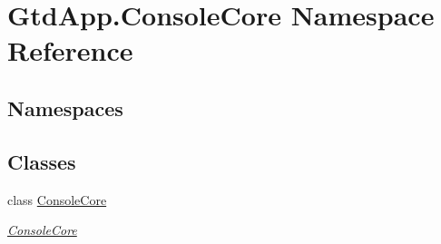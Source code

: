\hypertarget{namespace_gtd_app_1_1_console_core}{}\section{Gtd\+App.\+Console\+Core Namespace Reference}
\label{namespace_gtd_app_1_1_console_core}
\subsection*{Namespaces}
\begin{DoxyCompactItemize}
\end{DoxyCompactItemize}
\subsection*{Classes}
\begin{DoxyCompactItemize}
\item 
class \mbox{\hyperlink{class_gtd_app_1_1_console_core_1_1_console_core}{Console\+Core}}
\begin{DoxyCompactList}\small\item\em \mbox{\hyperlink{class_gtd_app_1_1_console_core_1_1_console_core}{Console\+Core}} \end{DoxyCompactList}\end{DoxyCompactItemize}
